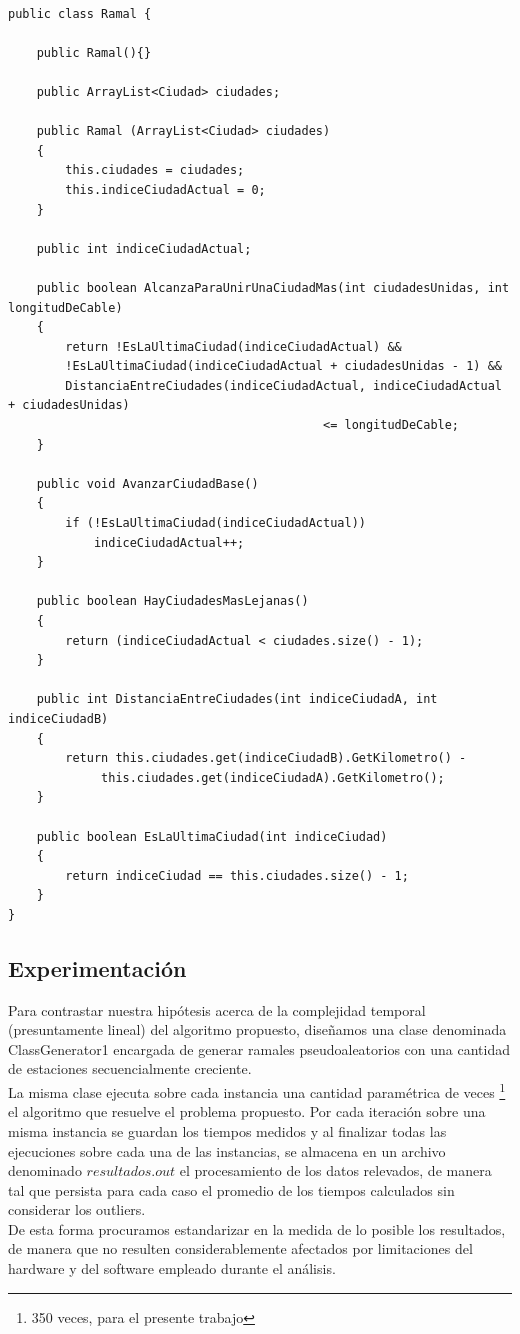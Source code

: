 \newpage
\begin{verbatim}

public class Ramal {
	
    public Ramal(){}

	public ArrayList<Ciudad> ciudades;

	public Ramal (ArrayList<Ciudad> ciudades)
	{
		this.ciudades = ciudades;
		this.indiceCiudadActual = 0;
	}
	
	public int indiceCiudadActual;
	
	public boolean AlcanzaParaUnirUnaCiudadMas(int ciudadesUnidas, int longitudDeCable) 
	{
		return !EsLaUltimaCiudad(indiceCiudadActual) &&
		!EsLaUltimaCiudad(indiceCiudadActual + ciudadesUnidas - 1) &&
		DistanciaEntreCiudades(indiceCiudadActual, indiceCiudadActual + ciudadesUnidas) 
											<= longitudDeCable; 
	}
	
	public void AvanzarCiudadBase()
	{
		if (!EsLaUltimaCiudad(indiceCiudadActual))
			indiceCiudadActual++;
	}
	
	public boolean HayCiudadesMasLejanas()
	{
		return (indiceCiudadActual < ciudades.size() - 1);
	}
	
	public int DistanciaEntreCiudades(int indiceCiudadA, int indiceCiudadB)
	{
		return this.ciudades.get(indiceCiudadB).GetKilometro() -
			 this.ciudades.get(indiceCiudadA).GetKilometro();
	}

	public boolean EsLaUltimaCiudad(int indiceCiudad) 
	{
		return indiceCiudad == this.ciudades.size() - 1;
	}
}

\end{verbatim}
\newpage
\subsection{Experimentaci\'on}

Para contrastar nuestra hipótesis acerca de la complejidad temporal (presuntamente lineal) del algoritmo propuesto, diseñamos una clase denominada ClassGenerator1 encargada de generar ramales pseudoaleatorios con una cantidad de estaciones secuencialmente creciente.\\ 
La misma clase ejecuta sobre cada instancia una cantidad paramétrica de veces \footnote{350 veces, para el presente trabajo} el algoritmo que resuelve el problema propuesto. Por cada iteración sobre una misma instancia se guardan los tiempos medidos y al finalizar todas las ejecuciones sobre cada una de las instancias, se almacena en un archivo denominado $resultados.out$ el procesamiento de los datos relevados, de manera tal que persista para cada caso el promedio de los tiempos calculados sin considerar los outliers.\\
De esta forma procuramos estandarizar en la medida de lo posible los resultados, de manera que no resulten considerablemente afectados por limitaciones del hardware y del software empleado durante el análisis. \\
 \newpage


